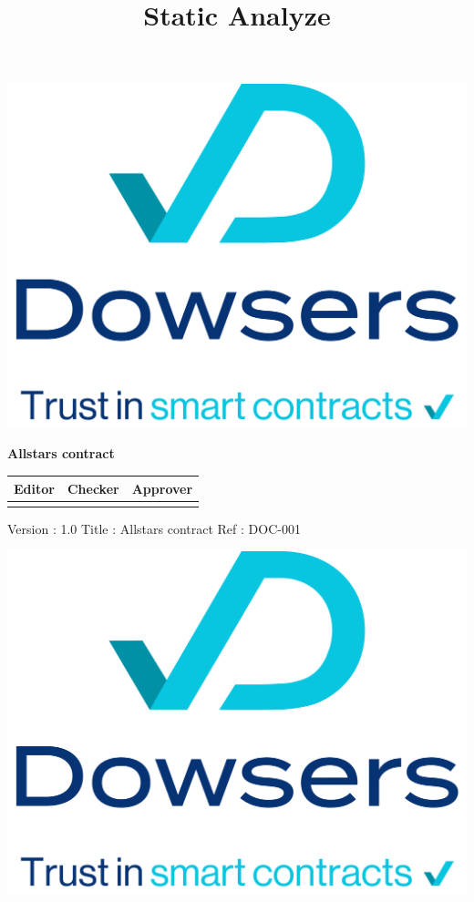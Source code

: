 \documentclass[a4paper,10pt]{article}
\title{Static Analyze}
\begin{document}
\begin{center}
  \includegraphics[width=0.5\linewidth]{./images/dowsers_logo_signature.png}
\end{center}

\vspace{1cm}

\begin{center}
  {\huge \textbf{Allstars contract}}
\end{center}

\vspace{1cm}

\begin{center}
  \begin{tabular}{|c|c|c|}
    \hline
    \textbf{Editor} & \textbf{Checker} & \textbf{Approver} \\
    \hline
     &  &  \\
    \hline
  \end{tabular}
\end{center}

\vspace{14cm}

\begin{center}
  Version : 1.0 \hspace{1cm} Title : Allstars contract \hspace{1cm} Ref : DOC-001
\end{center}

\newpage


\pagestyle{fancy}

\begin{center}
  \includegraphics[width=0.5\linewidth]{./images/dowsers_logo_signature.png}
\end{center}
\end{document}
